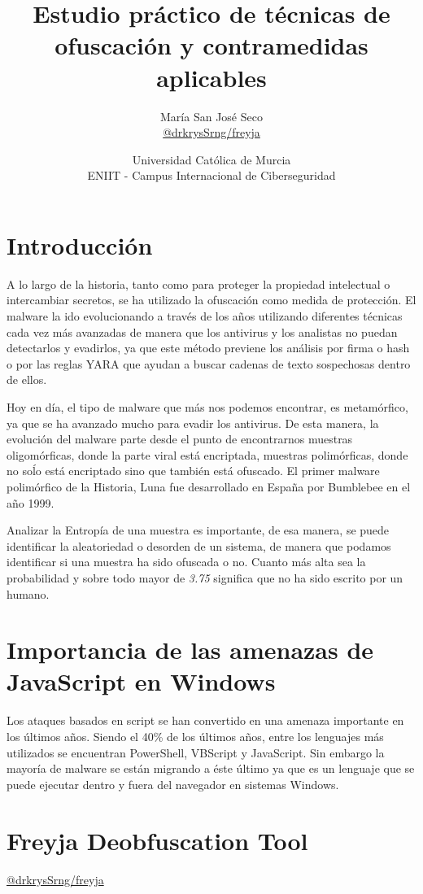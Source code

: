 \documentclass[a4paper]{article}
\title{Estudio práctico de técnicas de ofuscación y contramedidas aplicables}
\author{María San José Seco \\ \href{https://github.com/drkrysSrng/freyja}{@drkrysSrng/freyja}}
\date{
	Universidad Católica de Murcia \\
	ENIIT - Campus Internacional de Ciberseguridad
}
\begin{document}
	\maketitle
	
	\section{Introducción}
		
	A lo largo de la historia, tanto como para proteger la propiedad intelectual o intercambiar secretos, se ha utilizado la ofuscación como medida de protección. El malware la ido evolucionando a través de los años utilizando diferentes técnicas cada vez más avanzadas de manera que los antivirus y los analistas no puedan detectarlos y evadirlos, ya que este método previene los análisis por firma o hash o por las reglas YARA que ayudan a buscar cadenas de texto sospechosas dentro de ellos. 

	Hoy en día, el tipo de malware que más nos podemos encontrar, es metamórfico, ya que se ha avanzado mucho para evadir los antivirus. De esta manera, la evolución del malware parte desde el punto de encontrarnos muestras oligomórficas, donde la parte viral está encriptada, muestras polimórficas, donde no soĺo está encriptado sino que también está ofuscado. El primer malware polimórfico de la Historia, Luna fue desarrollado en España por Bumblebee en el año 1999. 
	
	
	Analizar la Entropía de una muestra es importante, de esa manera,  se puede identificar la aleatoriedad o desorden de un sistema, de manera que podamos identificar si una muestra ha sido ofuscada o no. Cuanto más alta sea la probabilidad y sobre todo mayor de \textit{3.75} significa que no ha sido escrito por un humano.
	
	\section{Importancia de las amenazas de JavaScript en Windows}
	Los ataques basados en script se han convertido en una amenaza importante en los últimos años. Siendo el 40\% de los últimos años, entre los lenguajes más utilizados se encuentran PowerShell, VBScript y JavaScript. Sin embargo la mayoría de malware se están migrando a éste último ya que es un lenguaje que se puede ejecutar dentro y fuera del navegador en sistemas Windows.
	
	
	\section{Freyja Deobfuscation Tool }
	\href{https://github.com/drkrysSrng/freyja}{@drkrysSrng/freyja}
	
\end{document}
